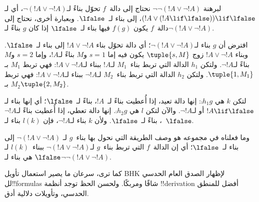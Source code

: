 \documentclass[../../../include/open-logic-section]{subfiles}
\begin{document}
\begin{ex}
لبرهنة $\lnot \lnot (!A \lor \lnot !A)$ نحتاج إلى دالة~$f$ تحوّل
بناءً لـ$\lnot(!A \lor \lnot !A)$، أي لـ
$(!A \lor (!A \lif \lfalse)) \lif \lfalse$، إلى بناء لـ~$\lfalse$.
وبعبارة أخرى، نحتاج إلى دالة~$f$ يكون $f(g)$ فيها بناء لـ~$\lfalse$
إذا كان $g$ بناءً لـ$\lnot(!A \lor \lnot !A)$.

افترض أن $g$ بناء لـ$\lnot(!A \lor \lnot !A)$؛ أي دالة تحوّل بناء
$!A \lor \lnot !A$ إلى بناء لـ~$\lfalse$. وبناء
$!A \lor \lnot !A$ زوج $\tuple{s, M}$ يكون فيه إما $s = 1$ و$M$
بناءً لـ$!A$، وإما $s = 2$ و$M$ بناءً لـ$\lnot !A$. ولتكن $h_1$
الدالة التي تربط بناء~$M_1$ لـ$!A$ ببناء لـ$!A \lor \lnot !A$:
فهي تربط $M_1$ بـ$\tuple{1, M_1}$. ولتكن $h_2$ الدالة التي تربط
بناء~$M_2$ لـ$\lnot !A$ ببناء لـ$!A \lor \lnot !A$: فهي تربط
$M_2$ بـ$\tuple{2, M_2}$.

لتكن $k$ هي $\comp{h_1}{g}$: إنها دالة تعيد، إذا أُعطيت بناءً لـ~$!A$،
بناءً لـ~$\lfalse$؛ أي إنها بناء لـ$!A \lif \lfalse$ أو لـ$\lnot !A$.
والآن لتكن $l$ هي $\comp{h_2}{g}$. إنها دالة تعطي، إذا أُعطيت بناءً
لـ$\lnot !A$، بناءً لـ~$\lfalse$. ولأن $k$ بناء لـ$\lnot !A$، فإن
$l(k)$ بناء لـ~$\lfalse$.

وما فعلناه في مجموعه هو وصف الطريقة التي نحول بها بناء~$g$ لـ
$\lnot(!A \lor \lnot !A)$ إلى بناء لـ~$\lfalse$؛ أي إن الدالة~$f$
التي تربط بناء~$g$ لـ$\lnot(!A \lor \lnot !A)$ ببناء~$l(k)$ لـ
$\lfalse$ هي بناء لـ$\lnot\lnot(!A \lor \lnot !A)$.
\end{ex}

كما ترى، سرعان ما يصير استعمال تأويل BHK لإظهار الصدق العام الحدسي
لل!!{formula}s شاقًا ومربكًا. ولحسن الحظ توجد أنظمة !!{derivation}
أفضل للمنطق الحدسي، وتأويلات دلالية أدق.
\end{document}
